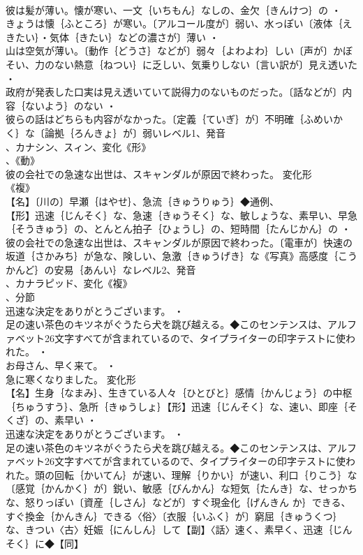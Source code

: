 \documentclass[8pt]{extreport}
\begin{document}
\begin{CJK}{UTF8}{min}
\\	彼は髪が薄い。懐が寒い、一文｛いちもん｝なしの、金欠｛きんけつ｝の ・
\\	きょうは懐｛ふところ｝が寒い。〔アルコール度が〕弱い、水っぽい〔液体｛えきたい｝・気体｛きたい｝などの濃さが〕薄い ・
\\	山は空気が薄い。〔動作｛どうさ｝などが〕弱々｛よわよわ｝しい〔声が〕かぼそい、力のない熱意｛ねつい｝に乏しい、気乗りしない〔言い訳が〕見え透いた ・
\\	政府が発表した口実は見え透いていて説得力のないものだった。〔話などが〕内容｛ないよう｝のない ・
\\	彼らの話はどちらも内容がなかった。〔定義｛ていぎ｝が〕不明確｛ふめいかく｝な〔論拠｛ろんきょ｝が〕弱いレベル1、発音
\\	、カナシン、スィン、変化《形》
\\	、《動》
\\	彼の会社での急速な出世は、スキャンダルが原因で終わった。	変化形 
\\	《複》
\\	【名】〔川の〕早瀬｛はやせ｝、急流｛きゅうりゅう｝◆通例、
\\	【形】迅速｛じんそく｝な、急速｛きゅうそく｝な、敏しょうな、素早い、早急｛そうきゅう｝の、とんとん拍子｛ひょうし｝の、短時間｛たんじかん｝の ・
\\	彼の会社での急速な出世は、スキャンダルが原因で終わった。〔電車が〕快速の坂道｛さかみち｝が急な、険しい、急激｛きゅうげき｝な《写真》高感度｛こう かんど｝の安易｛あんい｝なレベル2、発音
\\	、カナラピッド、変化《複》
\\	、分節
\\	迅速な決定をありがとうございます。 ・
\\	足の速い茶色のキツネがぐうたら犬を跳び越える。◆このセンテンスは、アルファベット26文字すべてが含まれているので、タイプライターの印字テストに使われた。 ・
\\	お母さん、早く来て。 ・
\\	急に寒くなりました。	変化形 
\\	【名】生身｛なまみ｝、生きている人々｛ひとびと｝感情｛かんじょう｝の中枢｛ちゅうすう｝、急所｛きゅうしょ｝【形】迅速｛じんそく｝な、速い、即座｛そくざ｝の、素早い ・
\\	迅速な決定をありがとうございます。 ・
\\	足の速い茶色のキツネがぐうたら犬を跳び越える。◆このセンテンスは、アルファベット26文字すべてが含まれているので、タイプライターの印字テストに使われた。頭の回転｛かいてん｝が速い、理解｛りかい｝が速い、利口｛りこう｝な〔感覚｛かんかく｝が〕鋭い、敏感｛びんかん｝な短気｛たんき｝な、せっかちな、怒りっぽい〔資産｛しさん｝などが〕すぐ現金化｛げんきん か｝できる、すぐ換金｛かんきん｝できる〈俗〉〔衣服｛いふく｝が〕窮屈｛きゅうくつ｝な、きつい〈古〉妊娠｛にんしん｝して【副】〈話〉速く、素早く、迅速｛じんそく｝に◆【同】

\end{CJK}
\end{document}
